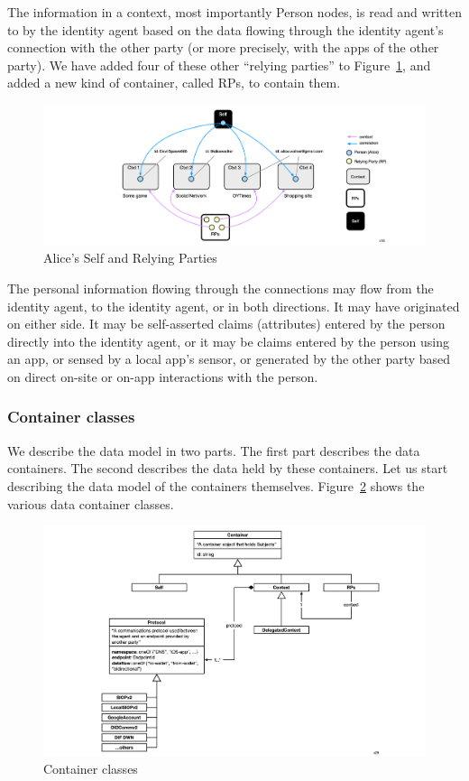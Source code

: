 \documentclass[11pt, oneside]{article}   	%
\begin{document}
The information in a context, most importantly Person nodes, is read and written to by the identity agent based on the data flowing through the identity agent's connection with the other party (or more precisely, with the apps of the other party). We have added four of these other ``relying parties'' to Figure~\ref{fig:RPs-container}, and added a new kind of container, called RPs, to contain them. 

\begin{figure}[h!]
\includegraphics[width=\textwidth]{./images/example2.png}
\caption{Alice's Self and Relying Parties}
\label{fig:RPs-container}
\end{figure}

The personal information flowing through the connections may flow from the identity agent, to the identity agent, or in both directions. It may have originated on either side. It may be self-asserted claims (attributes) entered by the person directly into the identity agent, or it may be claims entered by the person using an app, or sensed by a local app's sensor, or generated by the other party based on direct on-site or on-app interactions with the person.

\subsubsection{Container classes}

We describe the data model in two parts. The first part describes the data containers. The second describes the data held by these containers. Let us start describing the data model of the containers themselves. Figure~\ref{fig:containers} shows the various data container classes. 

\begin{figure}[h!]
\includegraphics[width=\textwidth]{./images/container-classes.png}
\caption{Container classes}
\label{fig:containers}
\end{figure} 
\end{document}
